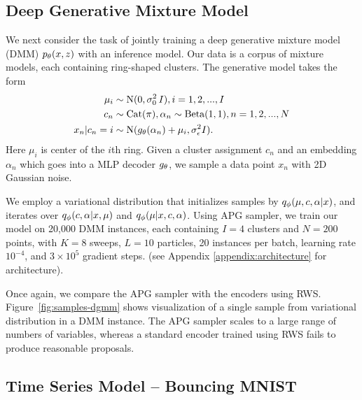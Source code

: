 \documentclass{article}
\theoremstyle{definition}
\begin{document}

\subsection{Deep Generative Mixture Model}
We next consider the task of jointly training a deep generative mixture model (DMM) $p_\theta(x, z)$ with an inference model. Our data is a corpus of mixture models, each containing ring-shaped clusters. The generative model takes the form
\begin{align*}
    \mu_i &\sim \text{N}(0, 
    \sigma_0^2 \, I), 
    i = 1, 2, ..., I \\
    c_n &\sim \mathrm{Cat}(\pi), \alpha_n \sim \text{Beta}(1, 1), n = 1, 2, ..., N \\
    x_n | c_n=i &\sim \text{N}(g_\theta(\alpha_n) + \mu_i, \sigma^2_{\epsilon} I).
\end{align*}
Here $\mu_i$ is center of the $i$th ring. Given a cluster assignment $c_n$ and an embedding $\alpha_n$ which goes into a MLP decoder $g_\theta$, we sample a data point $x_n$ with 2D Gaussian noise. 

We employ a variational distribution that initializes samples by $q_\phi(\mu, c, \alpha| x)$, and iterates over  $q_\phi(c, \alpha | x, \mu)$ and $q_\phi(\mu | x, c, \alpha)$. Using APG sampler, we train our model on 20,000 DMM instances, each containing $I = 4$ clusters and $N=200$ points, with $K=8$ sweeps, $L=10$ particles, 20 instances per batch, learning rate $10^{-4}$, and $3\times10^5$ gradient steps. (see Appendix \ref{appendix:architecture} for architecture).

Once again, we compare the APG sampler with the encoders using RWS. Figure~\ref{fig:samples-dgmm} shows visualization of a single sample from variational distribution in a DMM instance. The APG sampler scales to a large range of numbers of variables, whereas a standard encoder trained using RWS fails to produce reasonable proposals.

\subsection{Time Series Model -- Bouncing MNIST}
\end{document}

